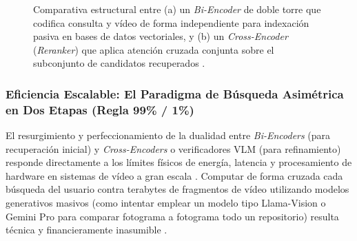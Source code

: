 \begin{figure}[htbp]
\caption{Comparativa estructural entre (a) un \textit{Bi-Encoder} de doble torre que codifica consulta y vídeo de forma independiente para indexación pasiva en bases de datos vectoriales, y (b) un \textit{Cross-Encoder} (\textit{Reranker}) que aplica atención cruzada conjunta sobre el subconjunto de candidatos recuperados \cite{learnopencv_qwen3, qwen3_vl_emb2026}.}
\label{fig:bi_encoder_vs_cross_encoder}
\end{figure}

\subsubsection{Eficiencia Escalable: El Paradigma de Búsqueda Asimétrica en Dos Etapas (Regla 99\% / 1\%)}
\label{subsubsec:busqueda_asimetrica_dos_etapas}

El resurgimiento y perfeccionamiento de la dualidad entre \textit{Bi-Encoders} (para recuperación inicial) y \textit{Cross-Encoders} o verificadores VLM (para refinamiento) responde directamente a los límites físicos de energía, latencia y procesamiento de hardware en sistemas de vídeo a gran escala \cite{learnopencv_qwen3, rethinking_long_video2026}. Computar de forma cruzada cada búsqueda del usuario contra terabytes de fragmentos de vídeo utilizando modelos generativos masivos (como intentar emplear un modelo tipo Llama-Vision o Gemini Pro para comparar fotograma a fotograma todo un repositorio) resulta técnica y financieramente inasumible \cite{learnopencv_qwen3}.

